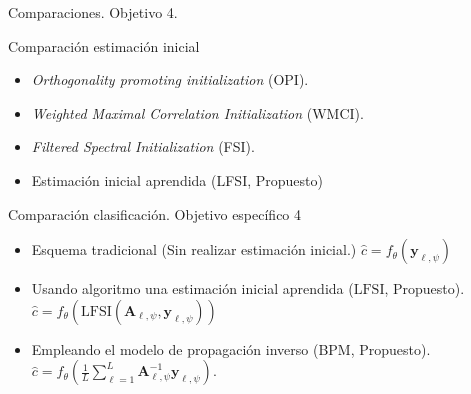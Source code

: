 \documentclass[aspectratio=169,t,xcolor=table]{beamer}
\begin{document}
\begin{frame}{Comparaciones. Objetivo 4. \textcolor{DarkGreen}{\checkmark}}
    \scriptsize
    \begin{block}{\scriptsize Comparación estimación inicial}
     
    \begin{itemize}
            \item \textit{Orthogonality promoting initialization} (OPI).
            \item \textit{Weighted Maximal Correlation Initialization} (WMCI).
            \item \textit{Filtered Spectral Initialization} (FSI).
        \item Estimación inicial aprendida (LFSI, Propuesto)
    \end{itemize}
    \end{block}
    \begin{block}{\scriptsize Comparación clasificación. Objetivo específico 4}
    \begin{itemize}
        \item Esquema tradicional (Sin realizar estimación inicial.) \hfill
        $  \hat{c} = f_\theta\left(\mathbf{y}_{\ell, \psi} \right)$
        \item Usando algoritmo una estimación inicial aprendida ($\mathrm{LFSI}$, Propuesto). \hfill
        $ \hat{c} = f_\theta\left( \mathrm{LFSI}\left(\mathbf{A}_{\ell,\psi},\mathbf{y}_{\ell, \psi}\right) \right)
        $
        \item Empleando el modelo de propagación inverso (BPM, Propuesto). \hfill 
        $\hat{c} = f_\theta\left( \frac{1}{L}\sum_{\ell=1}^{ L} \mathbf{A}_{\ell, \psi}^{-1}\mathbf{y}_{\ell, \psi} \right).$
    \end{itemize}
        
    \end{block}
    
\end{frame}
\end{document}
